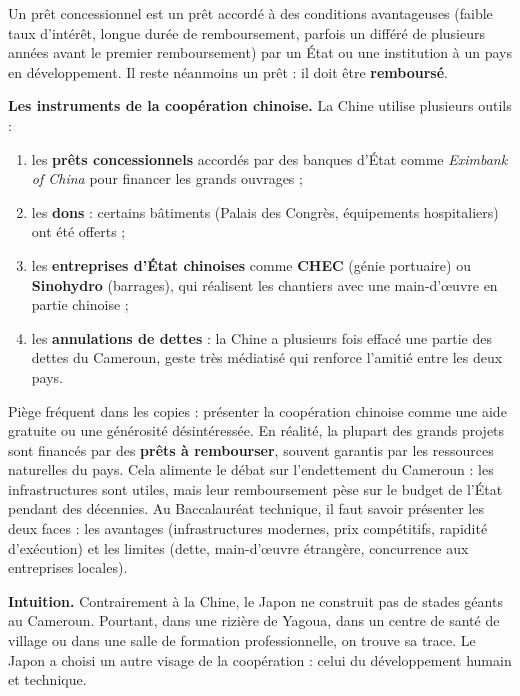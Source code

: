 \documentclass[11pt]{article}
\newcommand{\cle}[1]{{\popxbold\color{popdark}#1}}
\newcounter{popsec}
\newcounter{popsub}
\newcommand{\courssub}[1]{%
  \stepcounter{popsub}%
  \par\vspace{9pt}\noindent{\popxbold\fontsize{11.5}{13}\selectfont\color{popink}{\color{poporange}\thepopsec.\thepopsub}\hspace{6pt}#1}\par\nopagebreak\vspace{4pt}
}
\begin{document}
\begin{definition}
Un \cle{prêt concessionnel} est un prêt accordé à des conditions avantageuses (faible taux d'intérêt, longue durée de remboursement, parfois un différé de plusieurs années avant le premier remboursement) par un État ou une institution à un pays en développement. Il reste néanmoins un prêt : il doit être \textbf{remboursé}.
\end{definition}

\textbf{Les instruments de la coopération chinoise.} La Chine utilise plusieurs outils :

\begin{enumerate}
\item les \textbf{prêts concessionnels} accordés par des banques d'État comme \emph{Eximbank of China} pour financer les grands ouvrages ;
\item les \textbf{dons} : certains bâtiments (Palais des Congrès, équipements hospitaliers) ont été offerts ;
\item les \textbf{entreprises d'État chinoises} comme \textbf{CHEC} (génie portuaire) ou \textbf{Sinohydro} (barrages), qui réalisent les chantiers avec une main-d'œuvre en partie chinoise ;
\item les \textbf{annulations de dettes} : la Chine a plusieurs fois effacé une partie des dettes du Cameroun, geste très médiatisé qui renforce l'amitié entre les deux pays.
\end{enumerate}

\begin{attention}
Piège fréquent dans les copies : présenter la coopération chinoise comme une aide gratuite ou une générosité désintéressée. En réalité, la plupart des grands projets sont financés par des \textbf{prêts à rembourser}, souvent garantis par les ressources naturelles du pays. Cela alimente le débat sur l'\cle{endettement} du Cameroun : les infrastructures sont utiles, mais leur remboursement pèse sur le budget de l'État pendant des décennies. Au Baccalauréat technique, il faut savoir présenter les deux faces : les avantages (infrastructures modernes, prix compétitifs, rapidité d'exécution) et les limites (dette, main-d'œuvre étrangère, concurrence aux entreprises locales).
\end{attention}

\courssub{La coopération nippo-camerounaise}

\textbf{Intuition.} Contrairement à la Chine, le Japon ne construit pas de stades géants au Cameroun. Pourtant, dans une rizière de Yagoua, dans un centre de santé de village ou dans une salle de formation professionnelle, on trouve sa trace. Le Japon a choisi un autre visage de la coopération : celui du \cle{développement humain} et technique.
\end{document}
